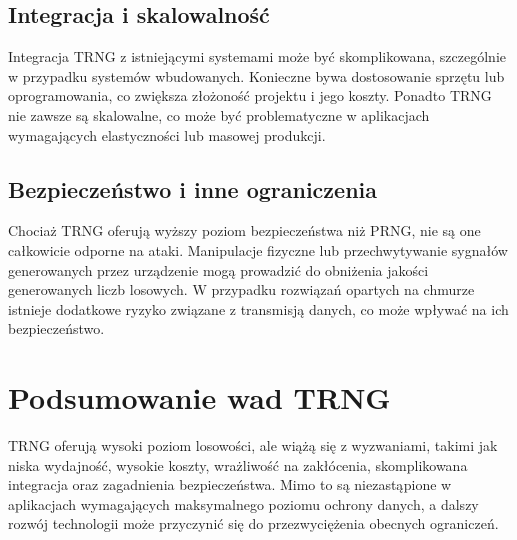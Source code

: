 \subsection{Integracja i skalowalność}

Integracja TRNG z istniejącymi systemami może być skomplikowana, szczególnie w przypadku systemów wbudowanych. Konieczne bywa dostosowanie sprzętu lub oprogramowania, co zwiększa złożoność projektu i jego koszty. Ponadto TRNG nie zawsze są skalowalne, co może być problematyczne w aplikacjach wymagających elastyczności lub masowej produkcji.

\subsection{Bezpieczeństwo i inne ograniczenia}

Chociaż TRNG oferują wyższy poziom bezpieczeństwa niż PRNG, nie są one całkowicie odporne na ataki. Manipulacje fizyczne lub przechwytywanie sygnałów generowanych przez urządzenie mogą prowadzić do obniżenia jakości generowanych liczb losowych. W przypadku rozwiązań opartych na chmurze istnieje dodatkowe ryzyko związane z transmisją danych, co może wpływać na ich bezpieczeństwo.

\section{Podsumowanie wad TRNG}

TRNG oferują wysoki poziom losowości, ale wiążą się z wyzwaniami, takimi jak niska wydajność, wysokie koszty, wrażliwość na zakłócenia, skomplikowana integracja oraz zagadnienia bezpieczeństwa. Mimo to są niezastąpione w aplikacjach wymagających maksymalnego poziomu ochrony danych, a dalszy rozwój technologii może przyczynić się do przezwyciężenia obecnych ograniczeń.
